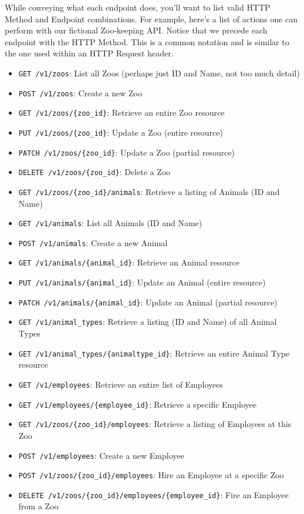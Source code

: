 While conveying what each endpoint does, you'll want to list valid HTTP Method and Endpoint combinations. For example, here's a list of actions one can perform with our fictional Zoo-keeping API. Notice that we precede each endpoint with the HTTP Method. This is a common notation and is similar to the one used within an HTTP Request header.

\begin{itemize}
\item \texttt{GET /v1/zoos}: List all Zoos (perhaps just ID and Name, not too much detail)
\item \texttt{POST /v1/zoos}: Create a new Zoo
\item \texttt{GET /v1/zoos/\{zoo\_id\}}: Retrieve an entire Zoo resource
\item \texttt{PUT /v1/zoos/\{zoo\_id\}}: Update a Zoo (entire resource)
\item \texttt{PATCH /v1/zoos/\{zoo\_id\}}: Update a Zoo (partial resource)
\item \texttt{DELETE /v1/zoos/\{zoo\_id\}}: Delete a Zoo
\item \texttt{GET /v1/zoos/\{zoo\_id\}/animals}: Retrieve a listing of Animals (ID and Name)
\item \texttt{GET /v1/animals}: List all Animals (ID and Name)
\item \texttt{POST /v1/animals}: Create a new Animal
\item \texttt{GET /v1/animals/\{animal\_id\}}: Retrieve an Animal resource
\item \texttt{PUT /v1/animals/\{animal\_id\}}: Update an Animal (entire resource)
\item \texttt{PATCH /v1/animals/\{animal\_id\}}: Update an Animal (partial resource)
\item \texttt{GET /v1/animal\_types}: Retrieve a listing (ID and Name) of all Animal Types
\item \texttt{GET /v1/animal\_types/\{animaltype\_id\}}: Retrieve an entire Animal Type resource
\item \texttt{GET /v1/employees}: Retrieve an entire list of Employees
\item \texttt{GET /v1/employees/\{employee\_id\}}: Retrieve a specific Employee
\item \texttt{GET /v1/zoos/\{zoo\_id\}/employees}: Retrieve a listing of Employees at this Zoo
\item \texttt{POST /v1/employees}: Create a new Employee
\item \texttt{POST /v1/zoos/\{zoo\_id\}/employees}: Hire an Employee at a specific Zoo
\item \texttt{DELETE /v1/zoos/\{zoo\_id\}/employees/\{employee\_id\}}: Fire an Employee from a Zoo
\end{itemize}


